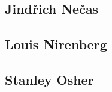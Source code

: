\documentclass{article}
\begin{document}
\subsection{Jind\v{r}ich Ne\v{c}as}


\subsection{Louis Nirenberg}
\cite{Vazquez2020}


\subsection{Stanley Osher}


\end{document}
